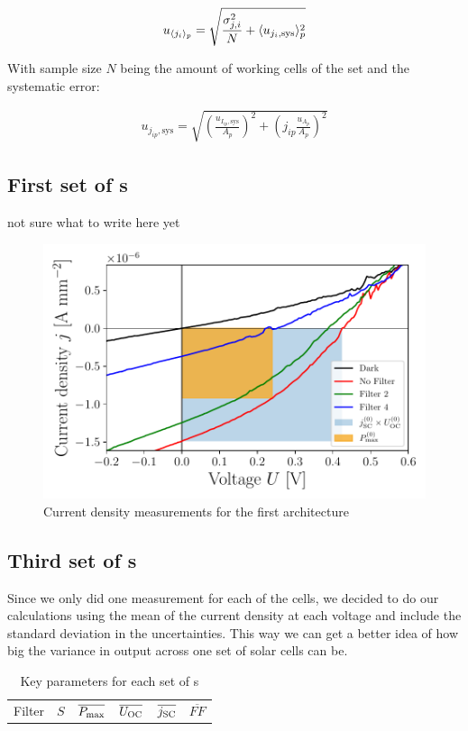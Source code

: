 \begin{align}
u_{\langle j_i \rangle_p} = \sqrt{\frac{\sigma_{j,i}^2}{N} + \langle u_{j_i,\text{sys}} \rangle_p^2}
\end{align}

With sample size $N$ being the amount of working cells of the set and the systematic error:

\begin{align}
u_{j_{ip},\text{sys}} = \sqrt{ \left( \frac{ u_{I_{ip},\text{sys}}}{A_p}\right)^2+\left( j_{ip}\frac{u_{A_p}}{A_p} \right)^2}
\end{align}

\subsection{First set of \BHSC s}

not sure what to write here yet

\begin{figure}[h]\centering
\includegraphics[width=\columnwidth]{../../../IV-Curve-Analysis/OSC1Graph.pdf}
\caption{Current density measurements for the first architecture}
\label{fig:OSC1Graph}
\end{figure}

\subsection{Third set of \BHSC s}

Since we only did one measurement for each of the cells, we decided to do our calculations using the mean of the current density at each voltage and include the standard deviation in the uncertainties. This way we can get a better idea of how big the variance in output across one set of solar cells can be.

\begin{table}[h]\centering
\caption{Key parameters for each set of \BHSC s}
\label{tab:keyparams}
\begin{tabular}{@{}cccccc@{}}\toprule
Filter & $S$ & $\overline{P_{\text{max}}}$ & $\overline{U_{\text{OC}}}$ & $\overline{j_{\text{SC}}}$ &$\overline{FF}$
\end{tabular}
\end{table}

